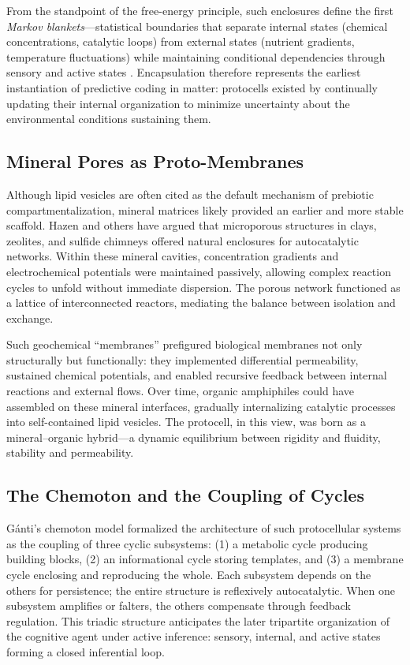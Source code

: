 \documentclass[11pt,a4paper]{article}
\begin{document}
From the standpoint of the free-energy principle, such enclosures define the first \emph{Markov blankets}—statistical boundaries that separate internal states (chemical concentrations, catalytic loops) from external states (nutrient gradients, temperature fluctuations) while maintaining conditional dependencies through sensory and active states \citep{Friston2010FreeEnergyPrinciple, Friston2013LifeAsWeKnowIt}.  Encapsulation therefore represents the earliest instantiation of predictive coding in matter: protocells existed by continually updating their internal organization to minimize uncertainty about the environmental conditions sustaining them.

\subsection{Mineral Pores as Proto-Membranes}

Although lipid vesicles are often cited as the default mechanism of prebiotic compartmentalization, mineral matrices likely provided an earlier and more stable scaffold.  Hazen \citep{Hazen2010EvolutionMinerals} and others have argued that microporous structures in clays, zeolites, and sulfide chimneys offered natural enclosures for autocatalytic networks.  Within these mineral cavities, concentration gradients and electrochemical potentials were maintained passively, allowing complex reaction cycles to unfold without immediate dispersion.  The porous network functioned as a lattice of interconnected reactors, mediating the balance between isolation and exchange.  

Such geochemical ``membranes'' prefigured biological membranes not only structurally but functionally: they implemented differential permeability, sustained chemical potentials, and enabled recursive feedback between internal reactions and external flows.  Over time, organic amphiphiles could have assembled on these mineral interfaces, gradually internalizing catalytic processes into self-contained lipid vesicles.  The protocell, in this view, was born as a mineral–organic hybrid—a dynamic equilibrium between rigidity and fluidity, stability and permeability.

\subsection{The Chemoton and the Coupling of Cycles}

Gánti’s chemoton model \citep{Ganti2003Chemoton} formalized the architecture of such protocellular systems as the coupling of three cyclic subsystems: (1) a metabolic cycle producing building blocks, (2) an informational cycle storing templates, and (3) a membrane cycle enclosing and reproducing the whole.  Each subsystem depends on the others for persistence; the entire structure is reflexively autocatalytic.  When one subsystem amplifies or falters, the others compensate through feedback regulation.  This triadic structure anticipates the later tripartite organization of the cognitive agent under active inference: sensory, internal, and active states forming a closed inferential loop.  
\end{document}
